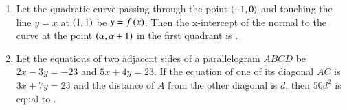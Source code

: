 \documentclass[journal]{IEEEtran}
\begin{document}
\begin{enumerate}[start = 16]
\item Let the quadratic curve passing through the point $\left(-1,0\right)$ and touching the line $y=x$ at $\left(1,1\right)$ be $y=f\left(x\right)$. Then the x-intercept of the normal to the curve at the point $\left(\alpha,\alpha + 1\right)$ in the first quadrant is \underline{\hspace{1 cm}}.
\item Let the equations of two adjacent sides of a parallelogram $ABCD$ be $2x-3y=-23$ and $5x + 4y = 23$. If the equation of one of its diagonal $AC$ is $3x + 7y = 23$ and the distance of $A$ from the other diagonal is $d$, then $50d^2$ is equal to \underline{\hspace{1 cm}}. 
\end{enumerate}
\end{document}
